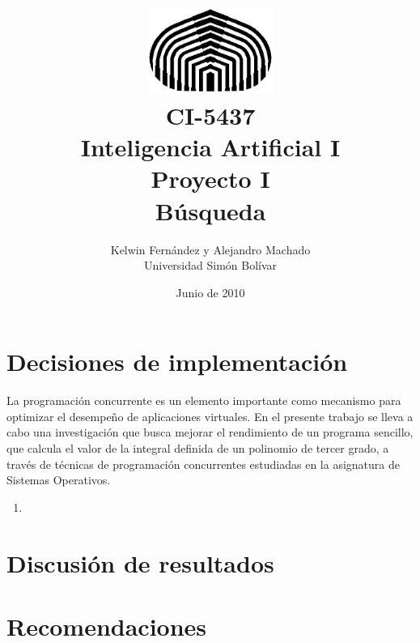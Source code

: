 \documentclass[letterpaper,12pt, titlepage]{article}
\begin{document}
\title{	\includegraphics[height=80pt]{usb.jpg} \\
CI-5437 \\ Inteligencia Artificial I \\
Proyecto I\\
Búsqueda}
\author{Kelwin Fernández y Alejandro Machado\\
	Universidad Simón Bolívar} 
\date{Junio de 2010} 
\maketitle

\section{Decisiones de implementación}
La programación concurrente es un elemento importante como mecanismo para optimizar
el desempeño de aplicaciones virtuales. En el presente trabajo se lleva a cabo una investigación
que busca mejorar el rendimiento de un programa sencillo, que calcula el valor de la integral definida 
de un polinomio de tercer grado, a través de técnicas de programación concurrentes estudiadas en
la asignatura de Sistemas Operativos. 

\begin{enumerate}
	\item
\end{enumerate}

\section{Discusión de resultados}

\section{Recomendaciones}
\end{document}
